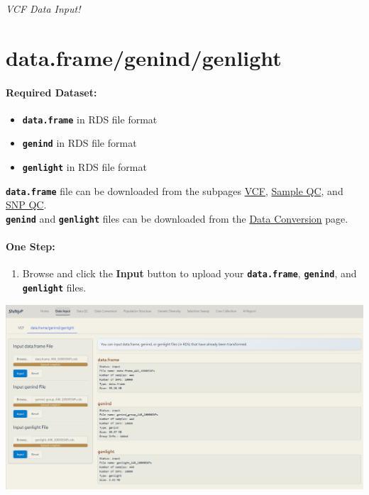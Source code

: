 \documentclass[
]{book}
\providecommand{\tightlist}{%
  \setlength{\itemsep}{0pt}\setlength{\parskip}{0pt}}
\begin{document}
\emph{VCF Data Input!}

\section{data.frame/genind/genlight}\label{data.framegenindgenlight}

\paragraph*{Required Dataset:}\label{required-dataset}

\begin{itemize}
\item
  {\textbf{\texttt{data.frame}}} in RDS file format
\item
  {\textbf{\texttt{genind}}} in RDS file format
\item
  {\textbf{\texttt{genlight}}} in RDS file format
\end{itemize}

{\textbf{\texttt{data.frame}}} file can be downloaded from the subpages \ul{VCF}, \ul{Sample QC}, and \ul{SNP QC}.\\
{\textbf{\texttt{genind}}} and {\textbf{\texttt{genlight}}} files can be downloaded from the \ul{Data Conversion} page.

\paragraph*{\texorpdfstring{\textbf{One Step:}}{One Step:}}\label{one-step}

\begin{enumerate}
\def\labelenumi{\arabic{enumi}.}
\tightlist
\item
  {Browse} and click the {\textbf{Input}} button to upload your {\textbf{\texttt{data.frame}}}, {\textbf{\texttt{genind}}}, and {\textbf{\texttt{genlight}}} files.
\end{enumerate}

\includegraphics[width=8.33333in,height=\textheight]{images/圖片17.png}
\end{document}

